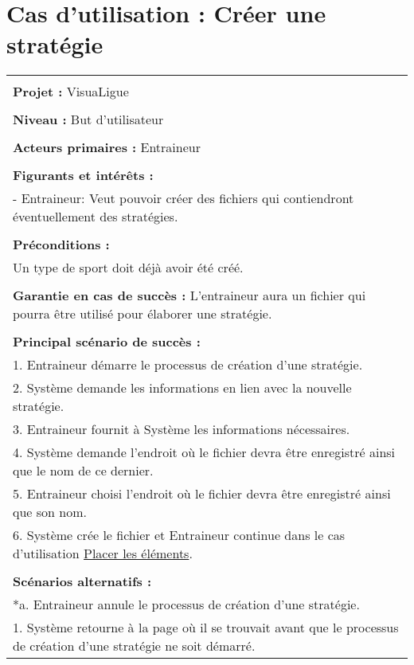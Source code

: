 \section{Cas d'utilisation : Créer une stratégie}
\begin{longtable}{|p{16cm}|}
	\hline
	\\
	\textbf{Projet :} VisuaLigue\\
	\\
	\textbf{Niveau :} But d'utilisateur\\
	\\
	\textbf{Acteurs primaires :} Entraineur\\
	\\
	\textbf{Figurants et intérêts :} \\
	- Entraineur: Veut pouvoir créer des fichiers qui contiendront éventuellement des stratégies.\\
	\\
	\textbf{Préconditions :} \\
	Un type de sport doit déjà avoir été créé. \\
	\\
	\textbf{Garantie en cas de succès :} L'entraineur aura un fichier qui pourra être utilisé pour élaborer une stratégie.\\
	\\
	\textbf{Principal scénario de succès :}\\
	1. Entraineur démarre le processus de création d'une stratégie.\\
	2. Système demande les informations en lien avec la nouvelle stratégie.\\
	3. Entraineur fournit à Système les informations nécessaires.\\
	4. Système demande l'endroit où le fichier devra être enregistré ainsi que le nom de ce dernier.\\
	5. Entraineur choisi l'endroit où le fichier devra être enregistré ainsi que son nom.\\
	6. Système crée le fichier et Entraineur continue dans le cas d'utilisation \underline{Placer les éléments}.\\
	\\
	\textbf{Scénarios alternatifs :}\\
	*a. Entraineur annule le processus de création d'une stratégie.\\
	\hspace{1cm}1. Système retourne à la page où il se trouvait avant que le processus de création d'une stratégie ne soit démarré.\\

\end{longtable}
